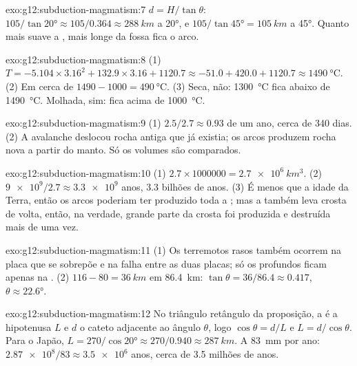\begin{solution}{exo:g12:subduction-magmatism:7}
$d = H/\tan\theta$: $105/\tan\ang{20} \approx 105/0.364 \approx
\qty{288}{km}$ a \ang{20}, e $105/\tan\ang{45} = \qty{105}{km}$ a
\ang{45}. Quanto mais suave a , mais longe da fossa fica o arco.
\end{solution}

\begin{solution}{exo:g12:subduction-magmatism:8}
(1) $T = -5.104 \times 3.16^2 + 132.9 \times 3.16 + 1120.7 \approx -51.0 +
420.0 + 1120.7 \approx \qty{1490}{\celsius}$. (2) Em cerca de $1490 - 1000 =
\qty{490}{\celsius}$. (3) Seca, não: \qty{1300}{\celsius} fica abaixo de
\qty{1490}{\celsius}. Molhada, sim: fica acima de \qty{1000}{\celsius}.
\end{solution}

\begin{solution}{exo:g12:subduction-magmatism:9}
(1) $2.5/2.7 \approx 0.93$ de um ano, cerca de 340 dias. (2) A avalanche
deslocou rocha antiga que já existia; os arcos produzem rocha nova a partir
do manto. Só os volumes são comparados.
\end{solution}

\begin{solution}{exo:g12:subduction-magmatism:10}
(1) $2.7 \times \num{1000000} = \qty{2.7e6}{km^3}$. (2) $\num{9e9}/2.7
\approx \num{3.3e9}$ anos, 3.3 bilhões de anos. (3) É menos que a idade da
Terra, então os arcos poderiam ter produzido toda a ; mas a
 também leva crosta de volta, então, na verdade, grande parte da
crosta foi produzida e destruída mais de uma vez.
\end{solution}

\begin{solution}{exo:g12:subduction-magmatism:11}
(1) Os terremotos rasos também ocorrem na placa que se sobrepõe e na falha
entre as duas placas; só os profundos ficam apenas na .
(2) $116 - 80 = \qty{36}{km}$ em \qty{86.4}{km}: $\tan\theta = 36/86.4
\approx 0.417$, $\theta \approx \ang{22.6}$.
\end{solution}

\begin{solution}{exo:g12:subduction-magmatism:12}
No triângulo retângulo da proposição, a  é a hipotenusa $L$ e $d$ o
cateto adjacente ao ângulo $\theta$, logo $\cos\theta = d/L$ e $L =
d/\cos\theta$. Para o Japão, $L = 270/\cos\ang{20} \approx 270/0.940 \approx
\qty{287}{km}$. A \qty{83}{mm} por ano: $\num{2.87e8}/83 \approx \num{3.5e6}$
anos, cerca de 3.5 milhões de anos.
\end{solution}


